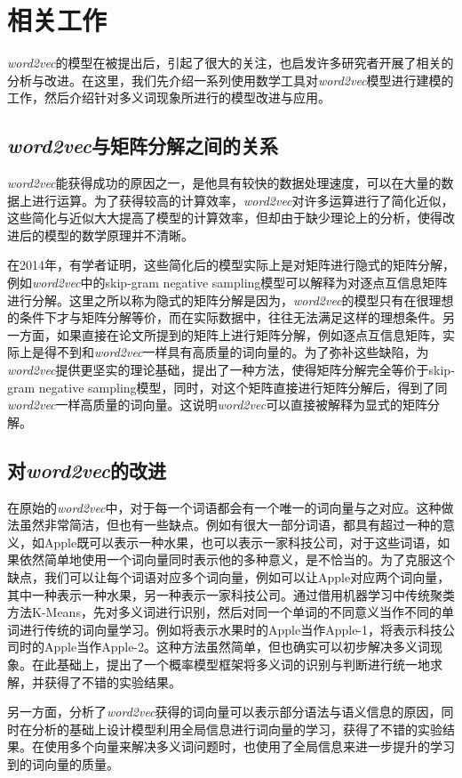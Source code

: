 \iffalse



\fi

\chapter{相关工作}

\emph{word2vec}的模型在被提出后，引起了很大的关注，也启发许多研究者开展了相关的分析与改进。在这里，我们先介绍一系列使用数学工具对\emph{word2vec}模型进行建模的工作，然后介绍针对多义词现象所进行的模型改进与应用。

\section{\emph{word2vec}与矩阵分解之间的关系}
\label{sec:word2vecmf}

\emph{word2vec}能获得成功的原因之一，是他具有较快的数据处理速度，可以在大量的数据上进行运算。为了获得较高的计算效率，\emph{word2vec}对许多运算进行了简化近似，这些简化与近似大大提高了模型的计算效率，但却由于缺少理论上的分析，使得改进后的模型的数学原理并不清晰。

在2014年，有学者证明，这些简化后的模型实际上是对矩阵进行隐式的矩阵分解\citep{levy2014neural}，例如\emph{word2vec}中的skip-gram negative sampling模型可以解释为对逐点互信息矩阵进行分解。这里之所以称为隐式的矩阵分解是因为，\emph{word2vec}的模型只有在很理想的条件下才与矩阵分解等价，而在实际数据中，往往无法满足这样的理想条件。另一方面，如果直接在论文所提到的矩阵上进行矩阵分解，例如逐点互信息矩阵，实际上是得不到和\emph{word2vec}一样具有高质量的词向量的。为了弥补这些缺陷，为\emph{word2vec}提供更坚实的理论基础，\citep{li2015word}提出了一种方法，使得矩阵分解完全等价于skip-gram negative sampling模型，同时，对这个矩阵直接进行矩阵分解后，得到了同\emph{word2vec}一样高质量的词向量。这说明\emph{word2vec}可以直接被解释为显式的矩阵分解。

\section{对\emph{word2vec}的改进}
\label{sec:intro_poly}

在原始的\emph{word2vec}中，对于每一个词语都会有一个唯一的词向量与之对应。这种做法虽然非常简洁，但也有一些缺点。例如有很大一部分词语，都具有超过一种的意义，如Apple既可以表示一种水果，也可以表示一家科技公司，对于这些词语，如果依然简单地使用一个词向量同时表示他的多种意义，是不恰当的。为了克服这个缺点，我们可以让每个词语对应多个词向量，例如可以让Apple对应两个词向量，其中一种表示一种水果，另一种表示一家科技公司。\citep{huang2012improving}通过借用机器学习中传统聚类方法K-Means\citep{macqueen1967some}，先对多义词进行识别，然后对同一个单词的不同意义当作不同的单词进行传统的词向量学习。例如将表示水果时的Apple当作Apple-1，将表示科技公司时的Apple当作Apple-2。这种方法虽然简单，但也确实可以初步解决多义词现象。在此基础上，\citep{tian2014probabilistic}提出了一个概率模型框架将多义词的识别与判断进行统一地求解，并获得了不错的实验结果。

另一方面，\citep{pennington2014glove}分析了\emph{word2vec}获得的词向量可以表示部分语法与语义信息的原因，同时在分析的基础上设计模型利用全局信息进行词向量的学习，获得了不错的实验结果。\citep{huang2012improving}在使用多个向量来解决多义词问题时，也使用了全局信息来进一步提升的学习到的词向量的质量。